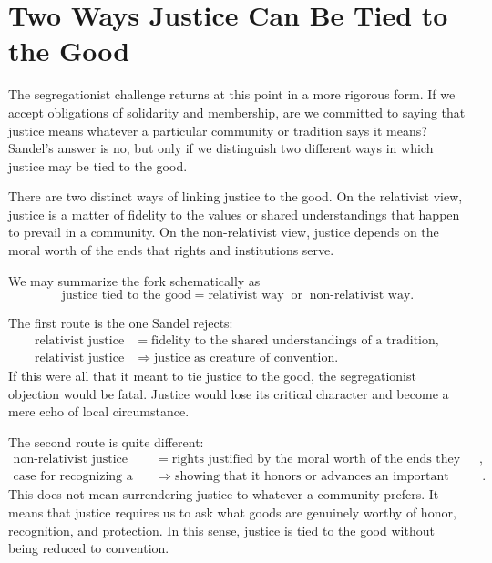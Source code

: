 \section{Two Ways Justice Can Be Tied to the Good}

The segregationist challenge returns at this point in a more rigorous form. If we accept obligations of solidarity and membership, are we committed to saying that justice means whatever a particular community or tradition says it means? Sandel's answer is no, but only if we distinguish two different ways in which justice may be tied to the good.

\begin{definition}
There are two distinct ways of linking justice to the good. On the relativist view, justice is a matter of fidelity to the values or shared understandings that happen to prevail in a community. On the non-relativist view, justice depends on the moral worth of the ends that rights and institutions serve.
\end{definition}

We may summarize the fork schematically as
\begin{equation}
\text{justice tied to the good}
=
\text{relativist way}
\;\;\text{or}\;\;
\text{non-relativist way}.
\end{equation}

The first route is the one Sandel rejects:
\begin{align}
\text{relativist justice}
&=
\text{fidelity to the shared understandings of a tradition},\\
\text{relativist justice}
&\Longrightarrow
\text{justice as creature of convention}.
\end{align}
If this were all that it meant to tie justice to the good, the segregationist objection would be fatal. Justice would lose its critical character and become a mere echo of local circumstance.

The second route is quite different:
\begin{align}
\text{non-relativist justice}
&=
\text{rights justified by the moral worth of the ends they serve},\\
\text{case for recognizing a right}
&\Longrightarrow
\text{showing that it honors or advances an important human good}.
\end{align}
This does not mean surrendering justice to whatever a community prefers. It means that justice requires us to ask what goods are genuinely worthy of honor, recognition, and protection. In this sense, justice is tied to the good without being reduced to convention.

